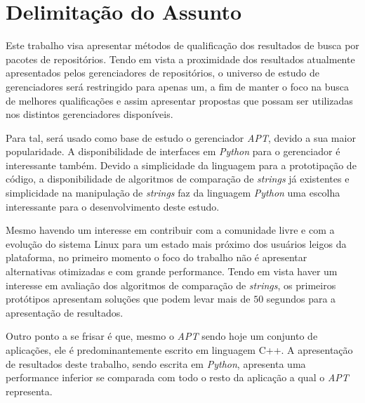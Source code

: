 \chapter{\nmu Delimitação do \nmu Assunto}
\label{cha:delimitacao}

Este trabalho visa apresentar métodos de qualificação dos resultados de busca por pacotes de repositórios. Tendo em vista a proximidade dos resultados atualmente apresentados pelos gerenciadores de repositórios, o universo de estudo de gerenciadores será restringido para apenas um, a fim de manter o foco na busca de melhores qualificações e assim apresentar propostas que possam ser utilizadas nos distintos gerenciadores disponíveis.

Para tal, será usado como base de estudo o gerenciador \textit{APT}, devido a sua maior popularidade. A disponibilidade de  interfaces em \textit{Python} para o gerenciador é interessante também. Devido a simplicidade da linguagem para a prototipação de código, a disponibilidade de algoritmos de comparação de \textit{strings} já existentes e simplicidade na manipulação de \textit{strings} faz da linguagem \textit{Python} uma escolha interessante para o desenvolvimento deste estudo.

Mesmo havendo um interesse em contribuir com a comunidade livre e com a evolução do sistema Linux para um estado mais próximo dos usuários leigos da plataforma, no primeiro momento o foco do trabalho não é apresentar alternativas otimizadas e com grande performance. Tendo em vista haver um interesse em avaliação dos algoritmos de comparação de \textit{strings}, os primeiros protótipos apresentam soluções que podem levar mais de $50$ segundos para a apresentação de resultados.

Outro ponto a se frisar é que, mesmo o \textit{APT} sendo hoje um conjunto de aplicações, ele é predominantemente escrito em linguagem C++. A apresentação de resultados deste trabalho, sendo escrita em \textit{Python}, apresenta uma performance inferior se comparada com todo o resto da aplicação a qual o \textit{APT} representa. %
